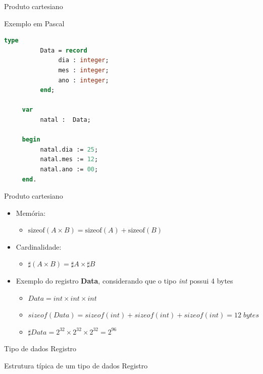 \documentclass[handout]{beamer}
\begin{document}
\begin{frame}[fragile]{Produto cartesiano}

\begin{block}{Exemplo em Pascal}
	\begin{lstlisting}[language=Pascal,numbers=none]
     type
          Data = record
               dia : integer;
               mes : integer;
               ano : integer;
          end;

     var
          natal :  Data;

     begin
          natal.dia := 25;
          natal.mes := 12;
          natal.ano := 00;
     end.
	\end{lstlisting}
\end{block}


\end{frame}



\begin{frame}{Produto cartesiano}
		\begin{itemize}
			\item Memória:
				\begin{itemize}
					\item $\mathrm{sizeof}(A \times B) = \mathrm{sizeof}(A) + \mathrm{sizeof}(B)$
				\end{itemize}

			\item Cardinalidade:
				\begin{itemize}
					\item $\sharp(A \times B) = \sharp A  \times \sharp B$
				\end{itemize}

			\item Exemplo do registro \textbf{Data}, considerando que o tipo \textit{int} possui 4 bytes
				\begin{itemize}
					\item $Data = int \times int \times int$
					\item $sizeof(Data) = sizeof(int) + sizeof(int) + sizeof(int) = 12\; bytes$
					\item $\sharp Data = 2^{32} \times 2^{32} \times 2^{32} = 2^{96}$
				\end{itemize}
		\end{itemize}
 \end{frame}

\begin{frame}[fragile]{Tipo de dados Registro}

	\begin{block}{Estrutura típica de um tipo de dados Registro}
		\centering
    \end{block}

\end{frame}
\end{document}
